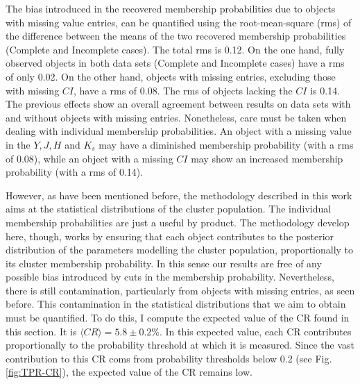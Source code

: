 The bias introduced in the recovered membership probabilities due to objects with missing value entries, can be quantified using the root-mean-square (rms) of the difference between the means of the two recovered membership probabilities (Complete and Incomplete cases). The total rms is 0.12. On the one hand, fully observed objects in both data sets (Complete and Incomplete cases) have a rms of only 0.02. On the other hand, objects with missing entries, excluding those with missing $CI$, have a rms of 0.08. The rms of objects lacking the $CI$ is 0.14. The previous effects show an overall agreement between results on data sets with and without objects with missing entries. Nonetheless, care must be taken when dealing with individual membership probabilities. An object with a missing value in the $Y,J,H$ and $K_s$ may have a diminished membership probability (with a rms of 0.08), while an object with a missing $CI$ may show an increased membership probability (with a rms of 0.14).  


However, as have been mentioned before, the methodology described in this work aims at the statistical distributions of the cluster population. The individual membership probabilities are just a useful by product. The methodology develop here, though, works by ensuring that each object contributes to the posterior distribution of the parameters modelling the cluster population, proportionally to its cluster membership probability. In this sense our results are free of any possible bias introduced by cuts in the membership probability. Nevertheless, there is still contamination, particularly from objects with missing entries, as seen before. This contamination in the statistical distributions that we aim to obtain must be quantified. To do this, I compute the expected value of the CR found in this section. It is $\langle CR \rangle=5.8\pm 0.2$\%. In this expected value, each CR contributes proportionally to the probability threshold at which it is measured. Since the vast contribution to this CR coms from probability thresholds below 0.2 (see Fig. \ref{fig:TPR-CR}), the expected value of the CR remains low. 


